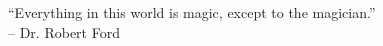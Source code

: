 

\begin{epigraph}

     ``Everything in this world is magic, except to the magician.''\\
         -- Dr. Robert Ford%
\end{epigraph}
